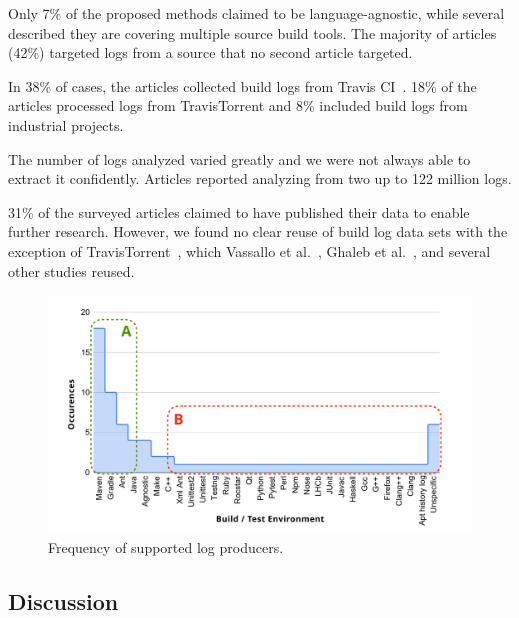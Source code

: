 Only 7\% of the proposed methods claimed to be language-agnostic, while
several described they are covering multiple source build tools.
The majority of articles (42\%) targeted logs from a source that no
second article
targeted.

In 38\% of cases, the articles collected build logs from Travis
CI~\cite{travisci2019webpage}.
18\% of the articles processed logs from TravisTorrent and 8\% included
build logs from industrial projects.

The number of logs analyzed varied greatly and we were not always able to
extract it confidently.
Articles reported analyzing from two up to 122 million logs.

31\% of the surveyed articles claimed to have published their data to
enable further research.
However, we found no clear reuse of build log data sets with the
exception of TravisTorrent~\cite{beller2017travistorrent}, which
Vassallo et al.~\cite{vassallo2017a-tale},
Ghaleb et al.~\cite{ghaleb2019studying}, and several other studies reused.

\begin{figure}[tbhp]
		\centering
		\includegraphics[width=\columnwidth, trim={1.1cm 0.4cm
		1.5cm 0.5cm},
		clip]{img/lit-sur/log_producer_annotated.pdf}
		\caption{Frequency of supported log producers.}
		\label{fig:litsur:log_producer}
\end{figure}


\subsection{Discussion}
\label{sec:lit-sur:discussion}

